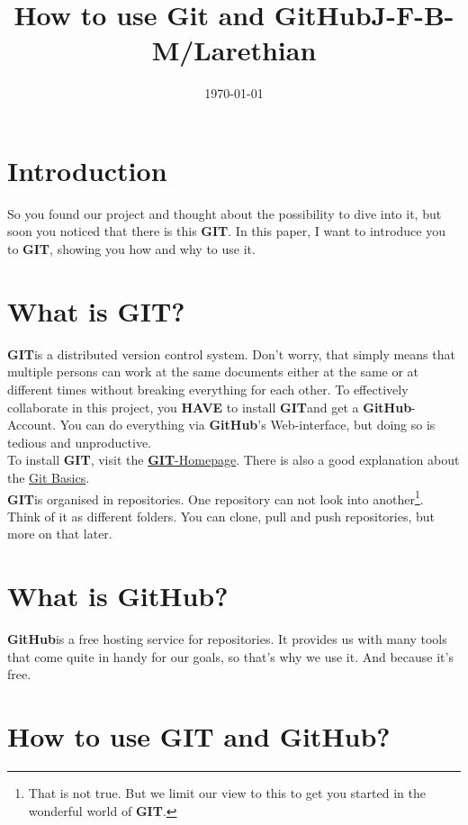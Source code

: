 \documentclass[a4paper]{article}
\title{How to use Git and GitHub}
\title{J-F-B-M/Larethian}
\date{\today}
\newcommand{\git}{\textbf{GIT}}
\newcommand{\github}{\textbf{GitHub}}
\begin{document}
\maketitle

\section{Introduction}

So you found our project and thought about the possibility to dive into it, but soon you noticed that there is this \git. In this paper, I want to introduce you to \git, showing you how and why to use it.

\section{What is GIT?}

\git is a distributed version control system. Don't worry, that simply means that multiple persons can work at the same documents either at the same or at different times without breaking everything for each other. To effectively collaborate in this project, you \textbf{HAVE} to install \git and get a \github -Account. You can do everything via \github's Web-interface, but doing so is tedious and unproductive.\\
To install \git, visit the \href{http://git-scm.com/}{\git -Homepage}. There is also a good explanation about the \href{http://git-scm.com/book/en/v2/Getting-Started-Git-Basics}{Git Basics}.\\
\git is organised in repositories. One repository can not look into another\footnote{That is not true. But we limit our view to this to get you started in the wonderful world of \git.}. Think of it as different folders. You can clone, pull and push repositories, but more on that later.

\section{What is GitHub?}

\github is a free hosting service for repositories. It provides us with many tools that come quite in handy for our goals, so that's why we use it. And because it's free.

\section{How to use GIT and GitHub?}
\end{document}
